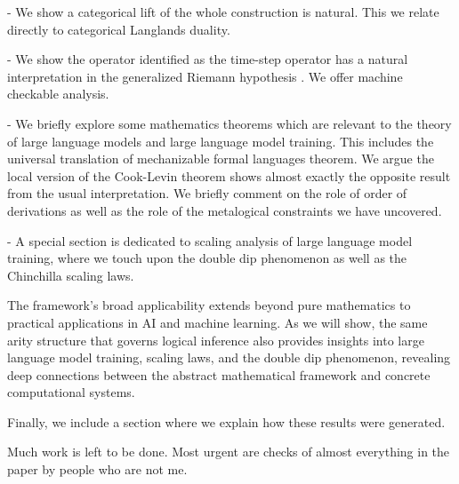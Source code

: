 - We show a categorical lift of the whole construction is natural. This we relate directly to categorical Langlands duality.

- We show the operator identified as the time-step operator has a natural interpretation in the generalized Riemann hypothesis \cite{riemann1859}. We offer machine checkable analysis. 

- We briefly explore some mathematics theorems which are relevant to the theory of large language models and large language model training. This includes the universal translation of mechanizable formal languages theorem. We argue the local version of the Cook-Levin theorem \cite{cook1971} shows almost exactly the opposite result from the usual interpretation. We briefly comment on the role of order of derivations as well as the role of the metalogical constraints we have uncovered. 

- A special section is dedicated to scaling analysis of large language model training, where we touch upon the double dip phenomenon as well as the Chinchilla scaling laws.

The framework's broad applicability extends beyond pure mathematics to practical applications in AI and machine learning. As we will show, the same arity structure that governs logical inference also provides insights into large language model training, scaling laws, and the double dip phenomenon, revealing deep connections between the abstract mathematical framework and concrete computational systems.

Finally, we include a section where we explain how these results were generated. 

Much work is left to be done. Most urgent are checks of almost everything in the paper by people who are not me.
